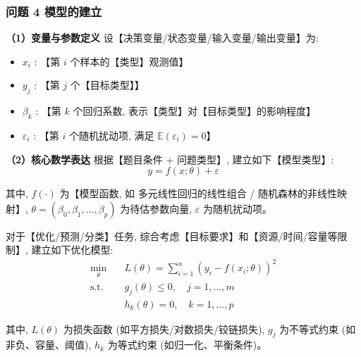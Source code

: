 
\subsubsection{问题 4 模型的建立}

\textbf{（1）变量与参数定义} \quad 设【决策变量/状态变量/输入变量/输出变量】为:
\begin{itemize}
  \item $x_i$ : 【第 $i$ 个样本的【类型】观测值】
  \item $y_j$ : 【第 $j$ 个【目标类型】】
  \item $\beta_k$ : 【第 $k$ 个回归系数, 表示【类型】对【目标类型】的影响程度】
  \item $\varepsilon_i$ : 【第 $i$ 个随机扰动项, 满足 $\mathbb{E}(\varepsilon_i)=0$】
\end{itemize}

\textbf{（2）核心数学表达} \quad 根据【题目条件 + 问题类型】, 建立如下【模型类型】:
\begin{equation}
  y = f(x; \theta) + \varepsilon
  \label{eq:model_q4}
\end{equation}

其中, $f(\cdot)$ 为【模型函数, 如 多元线性回归的线性组合 / 随机森林的非线性映射】, $\theta = (\beta_0, \beta_1, \ldots, \beta_p)$ 为待估参数向量, $\varepsilon$ 为随机扰动项。

对于【优化/预测/分类】任务, 综合考虑【目标要求】和【资源/时间/容量等限制】, 建立如下优化模型:
\begin{align}
  \min_{\theta} \quad & L(\theta) = \sum_{i=1}^{n} (y_i - f(x_i; \theta))^2 \\
  \text{s.t.} \quad & g_j(\theta) \leq 0, \quad j=1,\ldots,m \\
  & h_k(\theta) = 0, \quad k=1,\ldots,p \label{eq:constraints_q4}
\end{align}

其中, $L(\theta)$ 为损失函数 (如平方损失/对数损失/铰链损失), $g_j$ 为不等式约束 (如非负、容量、阈值), $h_k$ 为等式约束 (如归一化、平衡条件)。


